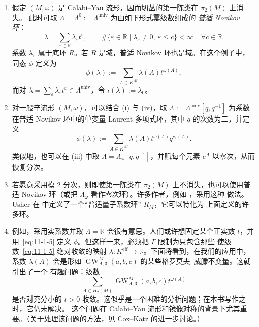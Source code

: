\begin{example}
\begin{enumerate}[label=\textnormal{(\roman*)}]
\item 假定 $(M,\omega)$ 是 Calabi--Yau 流形，因而切丛的第一陈类在 $\pi_2(M)$ 上消失。
此时可取 $\Lambda=\Lambda^0:=\Lambda^{\mathrm{univ}}$ 为由如下形式幂级数组成的
\emph{普适 Novikov 环}：
\[
  \lambda=\sum_{\varepsilon\in\mathbb R}\lambda_\varepsilon t^\varepsilon,
  \qquad
  \#\{\varepsilon\in\mathbb R\mid
  \lambda_\varepsilon\ne0,\ \varepsilon\le c\}<\infty
  \quad\forall c\in\mathbb R.
\]
系数 $\lambda_\varepsilon$ 属于底环 $R$。若 $R$ 是域，普适 Novikov 环也是域。在这个例子中，
同态 $\phi$ 定义为
\begin{equation}\label{eq:11-1-5}
  \phi(\lambda):=\sum_{A\in K^{\mathrm{eff}}}\lambda(A)t^{\omega(A)},
\end{equation}
而对 $\lambda=\sum_\varepsilon\lambda_\varepsilon t^\varepsilon
\in\Lambda^{\mathrm{univ}}$，令 $\iota(\lambda):=\lambda_0$。

\item 对一般辛流形 $(M,\omega)$，可以结合 (i) 与 (iv)，取
$\Lambda:=\Lambda^{\mathrm{univ}}[q,q^{-1}]$ 为系数在普适 Novikov 环中的单变量 Laurent
多项式环，其中 $q$ 的次数为二，并定义
\[
  \phi(\lambda):=\sum_{A\in K^{\mathrm{eff}}}
  \lambda(A)t^{\omega(A)}q^{c_1(A)}.
\]
类似地，也可以在 (iii) 中取 $\Lambda=\Lambda_\omega[q,q^{-1}]$，并赋每个元素 $e^A$
以零次，从而恢复分次。

\item 若愿意采用模 $2$ 分次，则即使第一陈类在 $\pi_2(M)$ 上不消失，也可以使用普适
Novikov 环（或把 $\Lambda_\omega$ 看作零次环）。许多作者，例如 ，采用这种
做法。Usher 在  中定义了一个“普适量子系数环” $R_M$，它可以特化为
上面定义的许多环。

\item 例如，采用实系数并取 $\Lambda=\mathbb R$ 会很有意思。人们或许想固定某个正实数
$t$，并用~\eqref{eq:11-1-5} 定义 $\phi$。但这样一来，必须把 $\Gamma$ 限制为只包含那些
使级数~\eqref{eq:11-1-5} 绝对收敛的映射
$\lambda:K^{\mathrm{eff}}\to\mathbb R$。下面将看到，在我们的应用中，系数 $\lambda(A)$
会是形如 $\operatorname{GW}_{A,3}^M(a,b,c)$ 的某些格罗莫夫--威滕不变量。这就引出了一个
有趣问题：级数
\[
  \sum_{A\in H_2(M)}\operatorname{GW}_{A,3}^M(a,b,c)t^{\omega(A)}
\]
是否对充分小的 $t>0$ 收敛。这似乎是一个困难的分析问题；在本书写作之时，它仍未解决。
这个问题在 Calabi--Yau 流形和镜像对称的背景下尤其重要。（关于处理该问题的方法，见
Cox--Katz  的进一步讨论。）
\end{enumerate}
\end{example}

